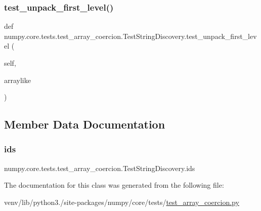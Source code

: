 \subsubsection{\texorpdfstring{test\+\_\+unpack\+\_\+first\+\_\+level()}{test\_unpack\_first\_level()}}
{\footnotesize\ttfamily def numpy.\+core.\+tests.\+test\+\_\+array\+\_\+coercion.\+Test\+String\+Discovery.\+test\+\_\+unpack\+\_\+first\+\_\+level (\begin{DoxyParamCaption}\item[{}]{self,  }\item[{}]{arraylike }\end{DoxyParamCaption})}



\subsection{Member Data Documentation}
\mbox{\label{classnumpy_1_1core_1_1tests_1_1test__array__coercion_1_1TestStringDiscovery_a81300f075cc9aa4c37b0845e7736ceac}} 
\subsubsection{\texorpdfstring{ids}{ids}}
{\footnotesize\ttfamily numpy.\+core.\+tests.\+test\+\_\+array\+\_\+coercion.\+Test\+String\+Discovery.\+ids\hspace{0.3cm}{\ttfamily [static]}}



The documentation for this class was generated from the following file\+:\begin{DoxyCompactItemize}
\item 
venv/lib/python3./site-\/packages/numpy/core/tests/\hyperlink{test__array__coercion_8py}{test\+\_\+array\+\_\+coercion.\+py}\end{DoxyCompactItemize}
